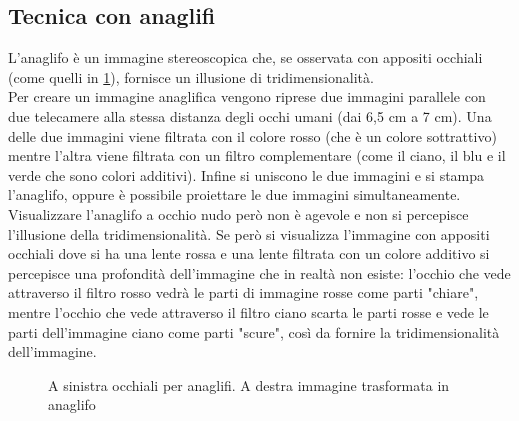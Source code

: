 \documentclass[12pt,a4paper,openright,twoside]{book}
\begin{document}
    \subsection{Tecnica con anaglifi}
    L'anaglifo è un immagine stereoscopica che, se osservata con appositi occhiali (come quelli in \figurename \ref{fig:anagl}), fornisce un illusione di tridimensionalità.\\
    Per creare un immagine anaglifica vengono riprese due immagini parallele con due telecamere alla stessa distanza degli occhi umani (dai 6,5 cm a 7 cm). Una delle due immagini viene filtrata con il colore rosso (che è un colore sottrattivo) mentre l'altra viene filtrata con un filtro complementare (come il ciano, il blu e il verde che sono colori additivi). Infine si uniscono le due immagini e si stampa l'anaglifo, oppure è possibile proiettare le due immagini simultaneamente.\\ Visualizzare l'anaglifo a occhio nudo però non è agevole e non si percepisce l'illusione della tridimensionalità. Se però si visualizza l'immagine con appositi occhiali dove si ha una lente rossa e una lente filtrata con un colore additivo si percepisce una profondità dell'immagine che in realtà non esiste: l'occhio che vede attraverso il filtro rosso vedrà le parti di immagine rosse come parti "chiare", mentre l'occhio che vede attraverso il filtro ciano scarta le parti rosse e vede le parti dell'immagine ciano come parti "scure", così da fornire la tridimensionalità dell'immagine. 
    \begin{figure}[h]
    	\centering
    	  \quad
    	\caption{A sinistra occhiali per anaglifi. A destra immagine trasformata in anaglifo}
    	\label{fig:anagl}
    \end{figure}
\end{document}
